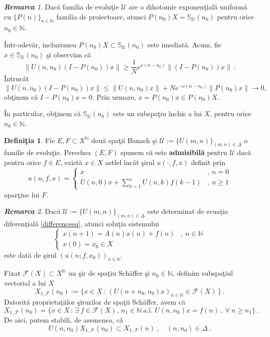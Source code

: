 \documentclass[ a4paper, 12pt]{report}
\newcommand{\F}{\mathcal{F}}
\newcommand{\N}{\mathbb{N}}
\newcommand{\defnemph}[1]{\textbf{#1}}
\theoremstyle{definition}
\newtheorem{definition}{\bf Defini\c tia}[section]
\theoremstyle{remark}
\newtheorem{remarc}{\bf Remarca}[section]
\numberwithin{equation}{section}
\begin{document}
\begin{remarc}
Dac\u a familia de evolu\c tie $\mathcal{U}$ are o dihotomie exponen\c tial\u a uniform\u a cu $\{P(n)\}_{n\in\N}$ familia de proiectoare,
atunci $P(n_0)X=\mathbb{S}_{\mathcal{U}}(n_0)$ pentru orice $n_0\in\N$.

\^Intr-adev\u ar, incluziunea $P(n_0)X\subset\mathbb{S}_{\mathcal{U}}(n_0)$ este imediat\u a. Acum, fie \\ $x\in\mathbb{S}_{\mathcal{U}}(n_0)$ %
\c si observ\u am c\u a
$$\|U(n,n_0)(I-P(n_0))x\|\geq \frac{1}{N}e^{\nu(n-n_0)}\|(I-P(n_0))x\|\ .$$
\^Intruc\^at
$$\|U(n,n_0)(I-P(n_0))x\|\leq \|U(n,n_0)x\| + Ne^{-\nu(n-n_0)}\|P(n_0)x\| \to 0,$$
ob\c tinem c\u a $I-P(n_0)x=0$. Prin urmare, $x=P(n_0)x\in P(n_0)X$.

\^In particular, ob\c tinem c\u a $\mathbb{S}_{\mathcal{U}}(n_0)$ este un subspa\c tiu \^inchis a lui $X$, pentru orice $n_0\in\N$.
\end{remarc}


\begin{definition}
\label{defn:admissibility}
Fie $E,F\subset X^{\N}$ dou\u a spa\c tii Banach \c si
$\mathcal{U}:=\{U(m,n)\}_{(m,n)\in\Delta}$ o familie de evolu\c tie.
Perechea $(E,F)$ spunem c\u a este \defnemph{admisibil\u a} pentru $\mathcal{U}$ dac\u a
pentru orice $f\in E$, exist\u a $x\in X$ astfel \^inc\^at \c sirul $u(\cdot,f,x)$ definit prin
$$u(n,f,x)= \begin{cases}
x &,\ n=0\\
\displaystyle U(n,0)x + \sum_{k=1}^{n}U(n,k)f(k-1) &,\ n\geq 1
\end{cases}
 $$
apar\c tine lui $F$.
\end{definition}

\begin{remarc}
Dac\u a $\mathcal{U}:=\{U(m,n)\}_{(m,n)\in\Delta}$ este determinat de ecua\c tia diferen\c tial\u a \eqref{differenceeq}, atunci
solu\c tia sistemului
$$\begin{cases}
x(n+1)=A(n) x(n) + f(n) &,\ n\in\N\\
x(0)=x_0\in X &
\end{cases} $$
este dat\u a de \c sirul $(u(n;f,x_0))_{n\in\N}$.
\end{remarc}


Fixat $\F(X)\subset X^{\N}$ un \c sir de spa\c tiu Sch\"{a}ffer  \c si
$n_0\in\N$, definim subspa\c tiul vectorial a lui $X$
\begin{equation}
X_{1,\F}(n_0):= \{x\in X\,:\, \left(U(n+n_0,n_0)x\right)_{n\in\N} \in \F(X)\,\}\ .
\end{equation}
Datorit\u a proprieta\c tiilor \c sirurilor de spa\c tii Sch\"{a}ffer, avem c\u a
$$X_{1,\F}(n_0)=\{x\in X\,:\, \exists \ f\in \F(X),\, n_1\in\N\ \text{a.\^i. }
U(n,n_0)x=f(n)\ \text{, } \forall\ n\geq n_1\}\ .$$
De aici, putem stabili, de asemenea, c\u a
\begin{equation}
U(n,n_0)X_{1,\F}(n_0)\subset X_{1,\F}(n)\ ,\quad (n,n_0)\in\Delta \ .
\end{equation}
\end{document}
